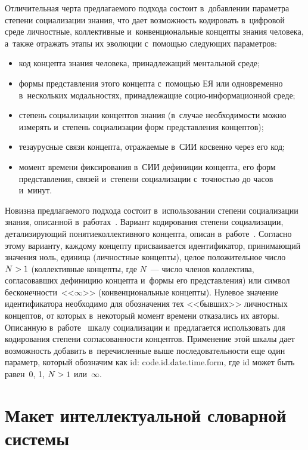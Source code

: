 \begin{multicols}{2}
  Отличительная черта предлагаемого подхода состоит в~добавлении 
параметра степени социализации знания, что дает возможность кодировать 
в~циф\-ро\-вой среде личностные, коллективные и~конвенциональные концепты 
знания человека, а~также отражать этапы их эволюции с~помощью сле\-ду\-ющих 
параметров:
  \begin{itemize}
  \item  код концепта знания человека, принадлежащий ментальной среде;
  \item формы представления этого концепта с~по\-мощью ЕЯ или одновременно в~нескольких 
  модальностях, принадлежащие со\-цио-ин\-фор\-ма\-ци\-он\-ной 
среде;
  \item степень социализации концептов знания (в~случае необходимости 
можно измерять и~степень социализации форм представления концептов);
  \item тезаурусные связи концепта, отражаемые в~СИИ косвенно через его 
код;
  \item момент времени фиксирования в~СИИ дефиниции концепта, его форм 
представления, связей и~степени социализации с~точностью до часов и~минут.
  \end{itemize}
  
  Новизна предлагаемого подхода состоит в~использовании степени 
социализации знания, описанной в~работах~\cite{3-zac, 4-zac}. Вариант 
кодирования степени социализации, детализирующий понятие\linebreak коллективного 
концепта, описан в~работе~\cite{30-zac}. Согласно этому варианту, каждому 
концепту присваивается идентификатор, принимающий значения ноль, единица 
(личностные концепты), целое положительное число $N\hm>1$ (коллективные 
концепты, где $N$~--- число членов коллектива, согласовавших дефиницию 
концепта и~формы его представления) или символ бесконечности~<<$\infty$>> 
(конвенциональные концепты). Нулевое значение идентификатора необходимо 
для обозначения тех <<бывших>> личностных концептов, от которых 
в~некоторый момент времени отказались их авторы. Описанную 
в~работе~\cite{30-zac} шкалу социализации и~предлагается использовать для 
кодирования степени согласованности концептов. Применение этой шкалы дает 
возможность добавить в~перечисленные выше последовательности еще один 
параметр, который обозначим как id: code.id.date.time.form, где id может 
быть равен~0, 1, $N\hm>1$ или~$\infty$.
  
\section{Макет интеллектуальной словарной системы}


\end{multicols}
